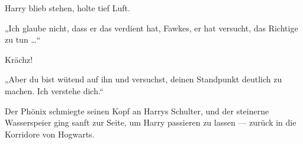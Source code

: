 Harry blieb stehen, holte tief Luft.

„Ich glaube nicht, dass er das verdient hat, Fawkes, er hat versucht, das Richtige zu tun …“

Krächz!

„Aber du bist wütend auf ihn und versuchst, deinen Standpunkt deutlich zu machen. Ich verstehe dich.“

Der Phönix schmiegte seinen Kopf an Harrys Schulter, und der steinerne Wasserspeier ging sanft zur Seite, um Harry passieren zu lassen — zurück in die Korridore von Hogwarts.

